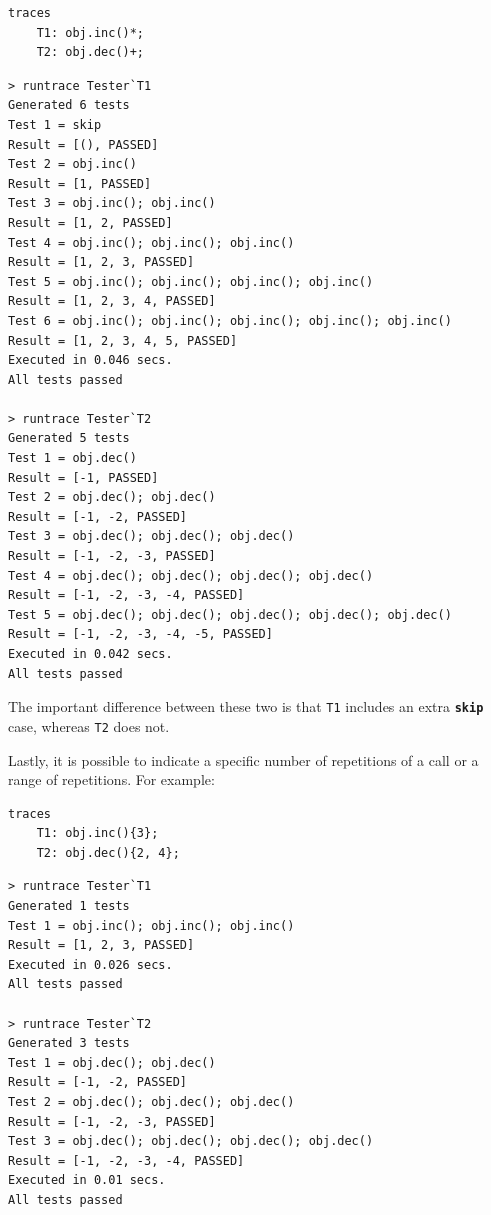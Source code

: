 \documentclass{overturerepchap}
\begin{document}
\small
\begin{lstlisting}
traces
    T1: obj.inc()*;
    T2: obj.dec()+;
\end{lstlisting}

\lstset{style=tool,language=}
\begin{lstlisting}[escapechar=@]
> runtrace Tester`T1
Generated 6 tests
Test 1 = skip
Result = [(), PASSED]
Test 2 = obj.inc()
Result = [1, PASSED]
Test 3 = obj.inc(); obj.inc()
Result = [1, 2, PASSED]
Test 4 = obj.inc(); obj.inc(); obj.inc()
Result = [1, 2, 3, PASSED]
Test 5 = obj.inc(); obj.inc(); obj.inc(); obj.inc()
Result = [1, 2, 3, 4, PASSED]
Test 6 = obj.inc(); obj.inc(); obj.inc(); obj.inc(); obj.inc()
Result = [1, 2, 3, 4, 5, PASSED]
Executed in 0.046 secs. 
All tests passed

> runtrace Tester`T2
Generated 5 tests
Test 1 = obj.dec()
Result = [-1, PASSED]
Test 2 = obj.dec(); obj.dec()
Result = [-1, -2, PASSED]
Test 3 = obj.dec(); obj.dec(); obj.dec()
Result = [-1, -2, -3, PASSED]
Test 4 = obj.dec(); obj.dec(); obj.dec(); obj.dec()
Result = [-1, -2, -3, -4, PASSED]
Test 5 = obj.dec(); obj.dec(); obj.dec(); obj.dec(); obj.dec()
Result = [-1, -2, -3, -4, -5, PASSED]
Executed in 0.042 secs. 
All tests passed
\end{lstlisting}
\lstset{style=mystyle}
\lstset{language=VDM++}
\normalsize

The important difference between these two is that \texttt{T1} includes an extra
\texttt{\textbf{skip}} case, whereas \texttt{T2} does not.

Lastly, it is possible to indicate a specific number of repetitions of a call or
a range of repetitions. For example:

\small
\begin{lstlisting}
traces
    T1: obj.inc(){3};
    T2: obj.dec(){2, 4};
\end{lstlisting}

\lstset{style=tool,language=}
\begin{lstlisting}[escapechar=@]
> runtrace Tester`T1
Generated 1 tests
Test 1 = obj.inc(); obj.inc(); obj.inc()
Result = [1, 2, 3, PASSED]
Executed in 0.026 secs. 
All tests passed

> runtrace Tester`T2
Generated 3 tests
Test 1 = obj.dec(); obj.dec()
Result = [-1, -2, PASSED]
Test 2 = obj.dec(); obj.dec(); obj.dec()
Result = [-1, -2, -3, PASSED]
Test 3 = obj.dec(); obj.dec(); obj.dec(); obj.dec()
Result = [-1, -2, -3, -4, PASSED]
Executed in 0.01 secs. 
All tests passed
\end{lstlisting}
\lstset{style=mystyle}
\lstset{language=VDM++}
\normalsize
\end{document}
